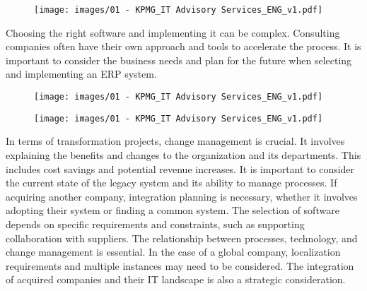 \begin{figure}[!h]
  \centering
  \texttt{[image: images/01 - KPMG\_IT Advisory Services\_ENG\_v1.pdf]}
\end{figure}

Choosing the right software and implementing it can be complex.
Consulting companies often have their own approach and tools to
accelerate the process. It is important to consider the business needs
and plan for the future when selecting and implementing an ERP system.

\begin{figure}[!h]
  \centering
  \texttt{[image: images/01 - KPMG\_IT Advisory Services\_ENG\_v1.pdf]}
\end{figure}

\begin{figure}[!h]
  \centering
  \texttt{[image: images/01 - KPMG\_IT Advisory Services\_ENG\_v1.pdf]}
\end{figure}

In terms of transformation projects, change management is crucial. It
involves explaining the benefits and changes to the organization and its
departments. This includes cost savings and potential revenue increases.
It is important to consider the current state of the legacy system and
its ability to manage processes. If acquiring another company,
integration planning is necessary, whether it involves adopting their
system or finding a common system. The selection of software depends on
specific requirements and constraints, such as supporting collaboration
with suppliers. The relationship between processes, technology, and
change management is essential. In the case of a global company,
localization requirements and multiple instances may need to be
considered. The integration of acquired companies and their IT landscape
is also a strategic consideration.